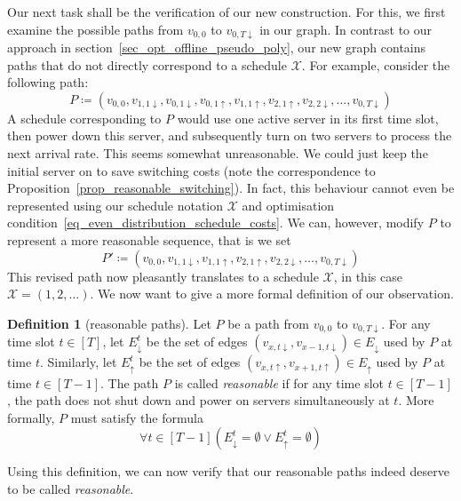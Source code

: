 \documentclass[hidelinks]{article}
\theoremstyle{plain}
\theoremstyle{definition}
\newtheorem{defn}[thm]{Definition}
\theoremstyle{rem}
\newcommand{\mx}{\mathcal{X}}
\begin{document}
Our next task shall be the verification of our new construction. For this, we first examine the possible paths from $v_{0,0}$ to $v_{0,T\downarrow}$ in our graph.
In contrast to our approach in section~\ref{sec_opt_offline_pseudo_poly}, our new graph contains paths that do not directly correspond to a schedule $\mx$. For example, consider the following path:
\begin{equation*}
	P\coloneqq(v_{0,0},v_{1,1\downarrow},v_{0,1\downarrow},v_{0,1\uparrow},v_{1,1\uparrow},v_{2,1\uparrow},v_{2,2\downarrow},\ldots,v_{0,T\downarrow})
\end{equation*}
A schedule corresponding to $P$ would use one active server in its first time slot, then power down this server, and subsequently turn on two servers to process the next arrival rate. This seems somewhat unreasonable. We could just keep the initial server on to save switching costs (note the correspondence to Proposition~\ref{prop_reasonable_switching}). In fact, this behaviour cannot even be represented using our schedule notation $\mx$ and optimisation condition~\eqref{eq_even_distribution_schedule_costs}. We can, however, modify $P$ to represent a more reasonable sequence, that is we set
\begin{equation*}
	P'\coloneqq(v_{0,0},v_{1,1\downarrow},v_{1,1\uparrow},v_{2,1\uparrow},v_{2,2\downarrow},\ldots,v_{0,T\downarrow})
\end{equation*}
This revised path now pleasantly translates to a schedule $\mx$, in this case $\mx=(1,2,\ldots)$. We now want to give a more formal definition of our observation.
\begin{defn}[reasonable paths]\label{defn_reasn_paths}
Let $P$ be a path from $v_{0,0}$ to $v_{0,T\downarrow}$. For any time slot $t\in[T]$, let $E_\downarrow^t$ be the set of edges $(v_{x,t\downarrow},v_{x-1,t\downarrow})\in E_\downarrow$ used by $P$ at time $t$. Similarly, let $E_\uparrow^t$ be the set of edges $(v_{x,t\uparrow},v_{x+1,t\uparrow})\in E_\uparrow$ used by $P$ at time $t\in[T-1]$.
The path $P$ is called \textit{reasonable} if for any time slot $t\in[T-1]$, the path does not shut down and power on servers simultaneously at $t$. More formally, $P$ must satisfy the formula
\begin{equation}
	\forall t\in[T-1]\left(E_\downarrow^t=\emptyset \lor E_\uparrow^t=\emptyset\right)\label{eq_reasn_path}
\end{equation}
\end{defn}
Using this definition, we can now verify that our reasonable paths indeed deserve to be called \textit{reasonable}.
\end{document}
